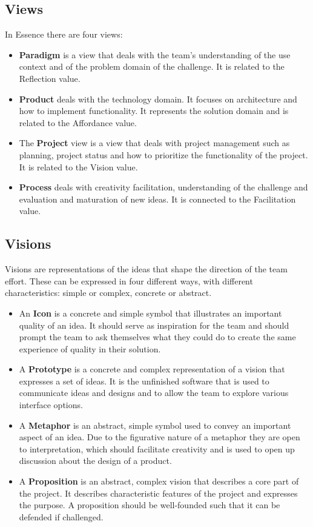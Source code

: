\subsection{Views} 
In Essence there are four views:

\begin{itemize}
\item \textbf{Paradigm} is a view that deals with the team's understanding of the use context and of the problem domain of the challenge. It is related to the Reflection value.
\item \textbf{Product} deals with the technology domain. It focuses on architecture and how to implement functionality. It represents the solution domain and is related to the Affordance value.
\item The \textbf{Project} view is a view that deals with project management such as planning, project status and how to prioritize the functionality of the project. It is related to the Vision value. 
\item \textbf{Process} deals with creativity facilitation, understanding of the challenge and evaluation and maturation of new ideas. It is connected to the Facilitation value. 
\end{itemize} 

\subsection{Visions} 
Visions are representations of the ideas that shape the direction of the team effort. These can be expressed in four different ways, with different characteristics: simple or complex, concrete or abstract.
\begin{itemize}
\item An \textbf{Icon} is a concrete and simple symbol that illustrates an important quality of an idea. It should serve as inspiration for the team and should prompt the team to ask themselves what they could do to create the same experience of quality in their solution.
\item A \textbf{Prototype} is a concrete and complex representation of a vision that expresses a set of ideas. It is the unfinished software that is used to communicate ideas and designs and to allow the team to explore various interface options. 
\item A \textbf{Metaphor} is an abstract, simple symbol used to convey an important aspect of an idea. Due to the figurative nature of a metaphor they are open to interpretation, which should facilitate creativity and is used to open up discussion about the design of a product. 
\item A \textbf{Proposition} is an abstract, complex vision that describes a core part of the project. It describes characteristic features of the project and expresses the purpose. A proposition should be well-founded such that it can be defended if challenged.
\end{itemize} 
